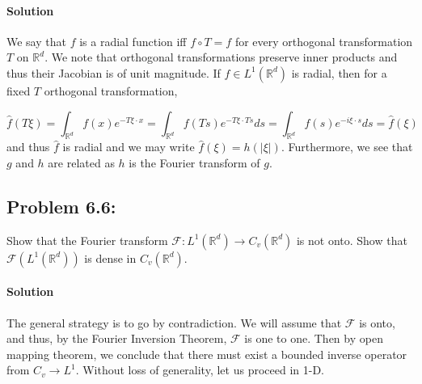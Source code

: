 \documentclass[letterpaper,twoside,11pt]{article}
\theoremstyle{mystyle}
\newcommand{\R}{{\mathbb R}}
\begin{document}
\paragraph*{Solution} 
We say that $f$ is a radial function iff $f \circ T = f$ for every orthogonal transformation $T$ on $\R^d$. We note that orthogonal transformations preserve inner products and thus their Jacobian is of unit magnitude. 
If $f\in L^1\left( \R^d \right)$ is radial, then for a fixed $T$ orthogonal transformation, 

\[\hat f\left( T\xi \right) = \int_{\R^d} f(x) e^{-T\xi\cdot x} = \int_{\R^d} f(Ts) e^{-T\xi\cdot Ts}ds = \int_{\R^d} f(s) e^{-i\xi \cdot s }ds = \hat f(\xi) \]
and thus $\hat f$ is radial and we may write $\hat f(\xi) = h(|\xi|)$. Furthermore, we see that $g$ and $h$ are related as $h$ is the Fourier transform of $g$. 




\subsection*{Problem 6.6:}
Show that the Fourier transform $\mathcal F : L^1\left( \R^d \right)\to C_v\left( \R^d \right)$ is not onto. Show that $\mathcal F\left( L^1\left( \R^d \right) \right)$ is dense in $C_v\left( \R^d \right)$. 

\paragraph*{Solution} 
The general strategy is to go by contradiction. We will assume that $\mathcal F$ is onto, and thus, by the Fourier Inversion Theorem, $\mathcal F$ is one to one. Then by open mapping theorem, we conclude that there must exist a bounded inverse operator from $C_v \to L^1$. Without loss of generality, let us proceed in 1-D.  
\end{document}
